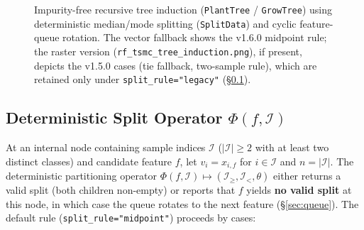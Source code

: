 \documentclass[11pt,a4paper]{article}
\newcommand{\code}[1]{\texttt{#1}}
\begin{document}
\begin{figure}[htbp]
{{%
    }%
  }
  \caption{Impurity-free recursive tree induction (\code{PlantTree} / \code{GrowTree}) using deterministic median/mode splitting (\code{SplitData}) and cyclic feature-queue rotation. The vector fallback shows the v1.6.0 midpoint rule; the raster version (\code{rf\_tsmc\_tree\_induction.png}), if present, depicts the v1.5.0 cases (tie fallback, two-sample rule), which are retained only under \code{split\_rule="legacy"} (\S\ref{sec:split}).}
  \label{fig:tree_induction}
\end{figure}

\subsection{Deterministic Split Operator \texorpdfstring{$\Phi(f, \mathcal{I})$}{Phi(f, I)}}
\label{sec:split}

At an internal node containing sample indices $\mathcal{I}$ ($|\mathcal{I}| \ge 2$ with at least two distinct classes) and candidate feature $f$, let $v_i = x_{i, f}$ for $i \in \mathcal{I}$ and $n = |\mathcal{I}|$. The deterministic partitioning operator $\Phi(f, \mathcal{I}) \mapsto (\mathcal{I}_{\ge}, \mathcal{I}_{<}, \theta)$ either returns a valid split (both children non-empty) or reports that $f$ yields \textbf{no valid split} at this node, in which case the queue rotates to the next feature (\S\ref{sec:queue}). The default rule (\code{split\_rule="midpoint"}) proceeds by cases:
\end{document}
